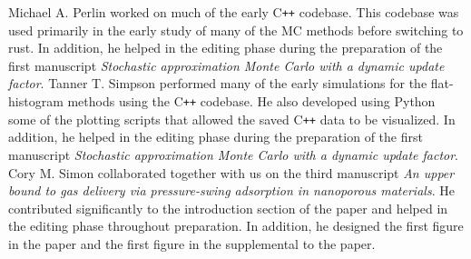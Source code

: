 Michael A. Perlin worked on much of the early C{}\verb!++! codebase. This
codebase was used primarily in the early study of many of the MC methods before
switching to rust. In addition, he helped in the editing phase during the
preparation of the first manuscript \emph{Stochastic approximation Monte Carlo
with a dynamic update factor}. Tanner T. Simpson performed many of the early
simulations for the flat-histogram methods using the C{}\verb!++! codebase. He
also developed using Python some of the plotting scripts that allowed the saved
C{}\verb!++! data to be visualized. In addition, he helped in the editing phase
during the preparation of the first manuscript \emph{Stochastic approximation
Monte Carlo with a dynamic update factor}. Cory M. Simon collaborated together
with us on the third manuscript \emph{An upper bound to gas delivery via
pressure-swing adsorption in nanoporous materials}. He contributed
significantly to the introduction section of the paper and helped in the
editing phase throughout preparation. In addition, he designed the first figure
in the paper and the first figure in the supplemental to the paper.